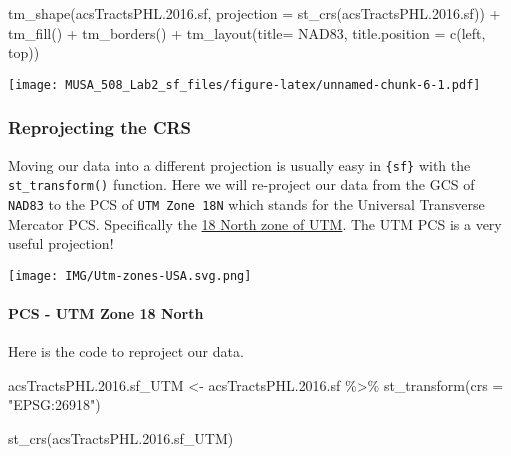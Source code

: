 \documentclass[
]{article}
\newenvironment{Shaded}{\begin{snugshade}}{\end{snugshade}}
\newcommand{\AttributeTok}[1]{\textcolor[rgb]{0.77,0.63,0.00}{#1}}
\newcommand{\FloatTok}[1]{\textcolor[rgb]{0.00,0.00,0.81}{#1}}
\newcommand{\FunctionTok}[1]{\textcolor[rgb]{0.00,0.00,0.00}{#1}}
\newcommand{\NormalTok}[1]{#1}
\newcommand{\OtherTok}[1]{\textcolor[rgb]{0.56,0.35,0.01}{#1}}
\newcommand{\SpecialCharTok}[1]{\textcolor[rgb]{0.00,0.00,0.00}{#1}}
\newcommand{\StringTok}[1]{\textcolor[rgb]{0.31,0.60,0.02}{#1}}
\begin{document}
\begin{Shaded}
\begin{Highlighting}[]
\FunctionTok{tm\_shape}\NormalTok{(acsTractsPHL.}\FloatTok{2016.}\NormalTok{sf,}
         \AttributeTok{projection =} \FunctionTok{st\_crs}\NormalTok{(acsTractsPHL.}\FloatTok{2016.}\NormalTok{sf)) }\SpecialCharTok{+}
  \FunctionTok{tm\_fill}\NormalTok{() }\SpecialCharTok{+}
  \FunctionTok{tm\_borders}\NormalTok{() }\SpecialCharTok{+}
  \FunctionTok{tm\_layout}\NormalTok{(}\AttributeTok{title=} \StringTok{\textquotesingle{}NAD83\textquotesingle{}}\NormalTok{, }
            \AttributeTok{title.position =} \FunctionTok{c}\NormalTok{(}\StringTok{\textquotesingle{}left\textquotesingle{}}\NormalTok{, }\StringTok{\textquotesingle{}top\textquotesingle{}}\NormalTok{))}
\end{Highlighting}
\end{Shaded}

\texttt{[image: MUSA\_508\_Lab2\_sf\_files/figure-latex/unnamed-chunk-6-1.pdf]}

\hypertarget{reprojecting-the-crs}{%
\subsubsection{Reprojecting the CRS}\label{reprojecting-the-crs}}

Moving our data into a different projection is usually easy in
\texttt{\{sf\}} with the \texttt{st\_transform()} function. Here we will
re-project our data from the GCS of \texttt{NAD83} to the PCS of
\texttt{UTM\ Zone\ 18N} which stands for the Universal Transverse
Mercator PCS. Specifically the
\href{https://www.spatialreference.org/ref/epsg/wgs-84-utm-zone-18n/}{18
North zone of UTM}. The UTM PCS is a very useful projection!

\texttt{[image: IMG/Utm-zones-USA.svg.png]}

\hypertarget{pcs---utm-zone-18-north}{%
\paragraph{PCS - UTM Zone 18 North}\label{pcs---utm-zone-18-north}}

Here is the code to reproject our data.

\begin{Shaded}
\begin{Highlighting}[]
\NormalTok{acsTractsPHL.}\FloatTok{2016.}\NormalTok{sf\_UTM }\OtherTok{\textless{}{-}}\NormalTok{ acsTractsPHL.}\FloatTok{2016.}\NormalTok{sf }\SpecialCharTok{\%\textgreater{}\%} 
  \FunctionTok{st\_transform}\NormalTok{(}\AttributeTok{crs =} \StringTok{"EPSG:26918"}\NormalTok{)}

\FunctionTok{st\_crs}\NormalTok{(acsTractsPHL.}\FloatTok{2016.}\NormalTok{sf\_UTM)}
\end{Highlighting}
\end{Shaded}
\end{document}
